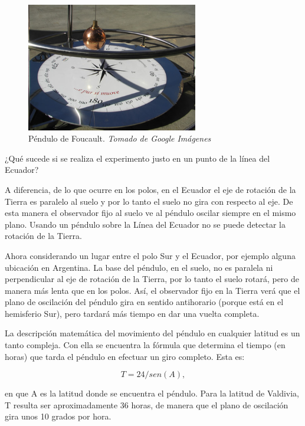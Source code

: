 \documentclass[journal]{IEEEtran}
\begin{document}
\begin{center}
  \begin{figure}[h!]
  \includegraphics[width=75mm]{pendulo_fourt.jpg}
  \caption{Péndulo de Foucault. \emph{Tomado de Google Imágenes}}
  \end{figure}
\end{center}

¿Qué sucede si se realiza el experimento justo en un punto de la línea del Ecuador?

A diferencia, de lo que ocurre en los polos, en el Ecuador el eje de rotación de la Tierra es paralelo al suelo y por lo tanto el suelo no gira con respecto al eje. De esta manera el observador fijo al suelo ve al péndulo oscilar siempre en el mismo plano. Usando un péndulo sobre la Línea del Ecuador no se puede detectar la rotación de la Tierra.

Ahora considerando un lugar entre el polo Sur y el Ecuador, por ejemplo alguna ubicación en Argentina. La base del péndulo, en el suelo, no es paralela ni perpendicular al eje de rotación de la Tierra, por lo tanto el suelo rotará, pero de manera más lenta que en los polos. Así, el observador fijo en la Tierra verá que el plano de oscilación del péndulo gira en sentido antihorario (porque está en el hemisferio Sur), pero tardará más tiempo en dar una vuelta completa.

La descripción matemática del movimiento del péndulo en cualquier latitud es un tanto compleja. Con ella se encuentra la fórmula que determina el tiempo (en horas) que tarda el péndulo en efectuar un giro completo. Esta es:

\begin{equation}
    T=24/sen(A),
\end{equation}

en que A es la latitud donde se encuentra el péndulo. Para la latitud de Valdivia, T resulta ser aproximadamente 36 horas, de manera que el plano de oscilación gira unos 10 grados por hora.
\end{document}
